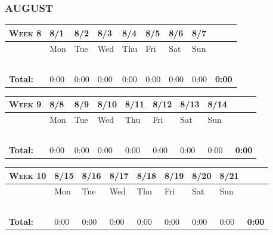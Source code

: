 \documentclass{article}
\begin{document}
\flushleft
\subsubsection*{AUGUST}

\begin{tabular}{ |m{1cm}||m{1cm}|m{1cm}|m{1cm}|m{1cm}|m{1cm}|m{1cm}|m{1cm}||m{1cm}|} 
\hline
\textsc{Week 8} & 8/1& 8/2 & 8/3 & 8/4 & 8/5 & 8/6 & 8/7 & \\ 
\hline
\rowcolor{lightgray} 
\cellcolor{white} & Mon & Tue & Wed & Thu & Fri & Sat & Sun & \cellcolor{white}\\ 
\hline
\hline
 & & & & & & & & \\ 
\hline
 & & & & & & & & \\ 
\hline
 & & & & & & & & \\ 
\hline
 & & & & & & & & \\ 
\hline
 & & & & & & & & \\ 
\hline
\textbf{Total:} & 0:00 & 0:00 & 0:00 & 0:00 & 0:00 & 0:00 & 0:00 & \textbf{0:00} \\
\hline
\end{tabular}

\vspace{0.2in}

\begin{tabular}{ |m{1cm}||m{1cm}|m{1cm}|m{1cm}|m{1cm}|m{1cm}|m{1cm}|m{1cm}||m{1cm}|} 
\hline
\textsc{Week 9} & 8/8& 8/9 & 8/10 & 8/11 & 8/12 & 8/13 & 8/14 & \\ 
\hline
\rowcolor{lightgray} 
\cellcolor{white} & Mon & Tue & Wed & Thu & Fri & Sat & Sun & \cellcolor{white}\\ 
\hline
\hline
 & & & & & & & & \\ 
\hline
 & & & & & & & & \\ 
\hline
 & & & & & & & & \\ 
\hline
 & & & & & & & & \\ 
\hline
 & & & & & & & & \\ 
\hline
\textbf{Total:} & 0:00 & 0:00 & 0:00 & 0:00 & 0:00 & 0:00 & 0:00 & \textbf{0:00} \\
\hline
\end{tabular}

\vspace{0.2in}

\begin{tabular}{ |m{1cm}||m{1cm}|m{1cm}|m{1cm}|m{1cm}|m{1cm}|m{1cm}|m{1cm}||m{1cm}|} 
\hline
\textsc{Week 10} & 8/15 & 8/16 & 8/17 & 8/18 & 8/19 & 8/20 & 8/21 & \\ 
\hline
\rowcolor{lightgray} 
\cellcolor{white} & Mon & Tue & Wed & Thu & Fri & Sat & Sun & \cellcolor{white}\\ 
\hline
\hline
 & & & & & & & & \\ 
\hline
 & & & & & & & & \\ 
\hline
 & & & & & & & & \\ 
\hline
 & & & & & & & & \\ 
\hline
 & & & & & & & & \\ 
\hline
\textbf{Total:} & 0:00 & 0:00 & 0:00 & 0:00 & 0:00 & 0:00 & 0:00 & \textbf{0:00} \\
\hline
\end{tabular}
\end{document}

